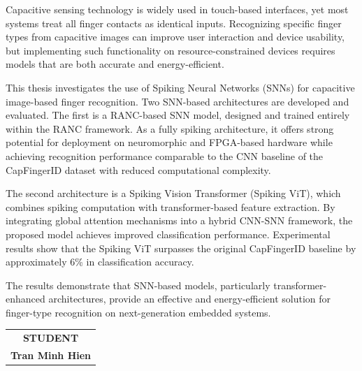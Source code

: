 Capacitive sensing technology is widely used in touch-based interfaces, yet most systems treat all finger contacts as identical inputs. Recognizing specific finger types from capacitive images can improve user interaction and device usability, but implementing such functionality on resource-constrained devices requires models that are both accurate and energy-efficient.

This thesis investigates the use of Spiking Neural Networks (SNNs) for capacitive image-based finger recognition. Two SNN-based architectures are developed and evaluated. The first is a RANC-based SNN model, designed and trained entirely within the RANC framework. As a fully spiking architecture, it offers strong potential for deployment on neuromorphic and FPGA-based hardware while achieving recognition performance comparable to the CNN baseline of the CapFingerID dataset with reduced computational complexity.

The second architecture is a Spiking Vision Transformer (Spiking ViT), which combines spiking computation with transformer-based feature extraction. By integrating global attention mechanisms into a hybrid CNN-SNN framework, the proposed model achieves improved classification performance. Experimental results show that the Spiking ViT surpasses the original CapFingerID baseline by approximately 6\% in classification accuracy.

The results demonstrate that SNN-based models, particularly transformer-enhanced architectures, provide an effective and energy-efficient solution for finger-type recognition on next-generation embedded systems.
\begin{flushright}
\begin{tabular}{@{}c@{}}
\textbf{STUDENT}\\[2.5cm]
\textbf{Tran Minh Hien}
\end{tabular}
\end{flushright}

